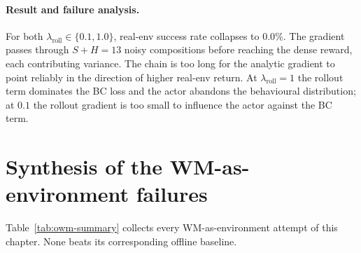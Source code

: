 \paragraph{Result and failure analysis.}
For both $\lambda_{\text{roll}} \in \{0.1, 1.0\}$, real-env success
rate collapses to $0.0\%$. The gradient passes through $S + H = 13$
noisy compositions before reaching the dense reward, each contributing
variance. The chain is too long for the analytic gradient to point
reliably in the direction of higher real-env return. At
$\lambda_{\text{roll}} = 1$ the rollout term dominates the BC loss and
the actor abandons the behavioural distribution; at $0.1$ the rollout
gradient is too small to influence the actor against the BC term.

\section{Synthesis of the WM-as-environment failures}
\label{sec:owm-synthesis}

Table~\ref{tab:owm-summary} collects every WM-as-environment attempt
of this chapter. None beats its corresponding offline baseline.


